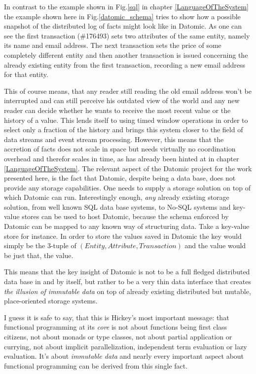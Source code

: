 In contrast to the example shown in Fig.\ref{sql} in
chapter \ref{LanguageOfTheSystem} the example shown here in
Fig.\ref{datomic_schema} tries to show how a possible snapshot of
the distributed log of facts might look like in Datomic. As one
can see the first transaction (\#176493) sets two attributes of
the same entity, namely its name and email address. The next
transaction sets the price of some completely different entity
and then another transaction is issued concerning the already
existing entity from the first transaction, recording a new email
address for that entity.

This of course means, that any reader still reading the old
email address won't be interrupted and can still perceive his
outdated view of the world and any new reader can decide whether
he wants to receive the most recent value or the history of a
value. This lends itself to using timed window operations in order
to select only a fraction of the history and brings this system
closer to the field of data streams and event stream processing.
However, this means that the accretion of facts does not
scale in space but needs virtually no coordination overhead and
therefor scales in time, as has already been hinted at in chapter
\ref{LanguageOfTheSystem}.
\newline
The relevant aspect of the Datomic project for the work presented
here, is the fact that Datomic, despite being a data base, does not
provide any storage capabilities. One needs to supply a storage
solution on top of which Datomic can run. Interestingly enough,
\textit{any} already existing storage solution, from well known
SQL data base systems, to No-SQL systems and key-value stores can
be used to host Datomic, because the schema enforced by Datomic
can be mapped to any known way of structuring data. Take a key-value
store for instance. In order to store the values saved in Datomic
the key would simply be the 3-tuple of $(Entity, Attribute, Transaction)$
and the value would be just that, the value.

This means that the key insight of Datomic is not to be a full fledged
distributed data base in and by itself, but rather to be a very
thin data interface that creates \textit{the illusion of immutable data}
on top of already existing distributed but mutable,
place-oriented storage systems.
\newline

I guess it is safe to say, that this is Hickey's most important
message: that functional programming at its \textit{core} is not
about functions being first class citizens, not about monads or
type classes, not about partial application or currying, not
about implicit parallelization, independent term evaluation or
lazy evaluation.
It's about \textit{immutable data} and nearly every important aspect about
functional programming can be derived from this single fact.

